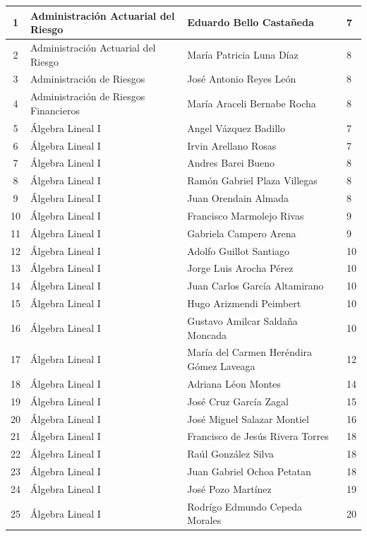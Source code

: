{\begin{longtable}{|c|p{6.5cm}|p{5cm}|p{1.5cm}|}
1 & Administración Actuarial del Riesgo & Eduardo Bello Castañeda & 7 \\ \hline
2 & Administración Actuarial del Riesgo & María Patricia Luna Díaz & 8 \\ \hline
3 & Administración de Riesgos & José Antonio Reyes León & 8 \\ \hline
4 & Administración de Riesgos Financieros & María Araceli Bernabe Rocha & 8 \\ \hline
5 & Álgebra Lineal I & Angel Vázquez Badillo & 7 \\ \hline
6 & Álgebra Lineal I & Irvin Arellano Rosas & 7 \\ \hline
7 & Álgebra Lineal I & Andres Barei Bueno & 8 \\ \hline
8 & Álgebra Lineal I & Ramón Gabriel Plaza Villegas & 8 \\ \hline
9 & Álgebra Lineal I & Juan Orendain Almada & 8 \\ \hline
10 & Álgebra Lineal I & Francisco Marmolejo Rivas & 9 \\ \hline
11 & Álgebra Lineal I & Gabriela Campero Arena & 9 \\ \hline
12 & Álgebra Lineal I & Adolfo Guillot Santiago & 10 \\ \hline
13 & Álgebra Lineal I & Jorge Luis Arocha Pérez & 10 \\ \hline
14 & Álgebra Lineal I & Juan Carlos García Altamirano & 10 \\ \hline
15 & Álgebra Lineal I & Hugo Arizmendi Peimbert & 10 \\ \hline
16 & Álgebra Lineal I & Gustavo Amilcar Saldaña Moncada & 10 \\ \hline
17 & Álgebra Lineal I & María del Carmen Heréndira Gómez Laveaga & 12 \\ \hline
18 & Álgebra Lineal I & Adriana Léon Montes & 14 \\ \hline
19 & Álgebra Lineal I & José Cruz García Zagal & 15 \\ \hline
20 & Álgebra Lineal I & José Miguel Salazar Montiel & 16 \\ \hline
21 & Álgebra Lineal I & Francisco de Jesús Rivera Torres & 18 \\ \hline
22 & Álgebra Lineal I & Raúl González Silva & 18 \\ \hline
23 & Álgebra Lineal I & Juan Gabriel Ochoa Petatan & 18 \\ \hline
24 & Álgebra Lineal I & José Pozo Martínez & 19 \\ \hline
25 & Álgebra Lineal I & Rodrígo Edmundo Cepeda Morales & 20 \\ \hline

\end{longtable}}
